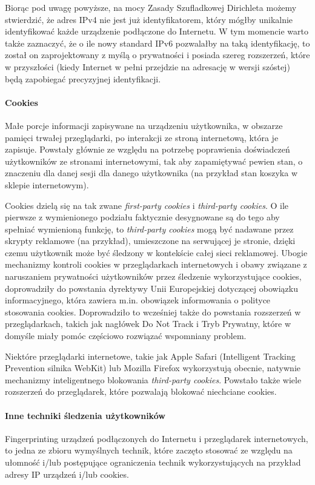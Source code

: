 Biorąc pod uwagę powyższe, na mocy Zasady Szufladkowej Dirichleta możemy
stwierdzić, że adres IPv4 nie jest już identyfikatorem, który mógłby unikalnie
identyfikować każde urządzenie podłączone do Internetu. W tym momencie warto
także zaznaczyć, że o ile nowy standard IPv6 pozwalałby na taką identyfikację,
to został on zaprojektowany z myślą o prywatności i posiada szereg rozszerzeń,
które w przyszłości (kiedy Internet w pełni przejdzie na adresację w wersji
szóstej) będą zapobiegać precyzyjnej identyfikacji.

\paragraph{Cookies}
Małe porcje informacji zapisywane na urządzeniu użytkownika, w obszarze pamięci
trwałej przeglądarki, po interakcji ze stroną internetową, która je zapisuje.
Powstały głównie ze względu na potrzebę poprawienia doświadczeń użytkowników ze
stronami internetowymi, tak aby zapamiętywać pewien stan, o znaczeniu dla danej
sesji dla danego użytkownika (na przykład stan koszyka w sklepie internetowym).

Cookies dzielą się na tak zwane \emph{first-party cookies} i \emph{third-party
cookies}. O ile pierwsze z wymienionego podziału faktycznie desygnowane są do
tego aby spełniać wymienioną funkcję, to \emph{third-party cookies} mogą być
nadawane przez skrypty reklamowe (na przykład), umieszczone na serwującej je
stronie, dzięki czemu użytkownik może być śledzony w kontekście całej sieci
reklamowej. Ubogie mechanizmy kontroli cookies w przeglądarkach internetowych i
obawy związane z naruszaniem prywatności użytkowników przez śledzenie
wykorzystujące cookies, doprowadziły do powstania dyrektywy Unii Europejskiej
dotyczącej obowiązku informacyjnego, która zawiera m.in. obowiązek informowania
o polityce stosowania cookies. Doprowadziło to wcześniej także do powstania
rozszerzeń w przeglądarkach, takich jak nagłówek Do Not Track i Tryb Prywatny,
które w domyśle miały pomóc częściowo rozwiązać wspomniany problem.

Niektóre przeglądarki internetowe, takie jak Apple Safari (Intelligent Tracking
Prevention silnika WebKit) lub Mozilla Firefox wykorzystują obecnie, natywnie
mechanizmy inteligentnego blokowania \emph{third-party cookies}. Powstało także
wiele rozszerzeń do przeglądarek, które pozwalają blokować niechciane cookies.

\paragraph{Inne techniki śledzenia użytkowników}
Fingerprinting urządzeń podłączonych do Internetu i przeglądarek internetowych,
to jedna ze zbioru wymyślnych technik, które zaczęto stosować ze względu na
ułomność i/lub postępujące ograniczenia technik wykorzystujących na przykład
adresy IP urządzeń i/lub cookies.

